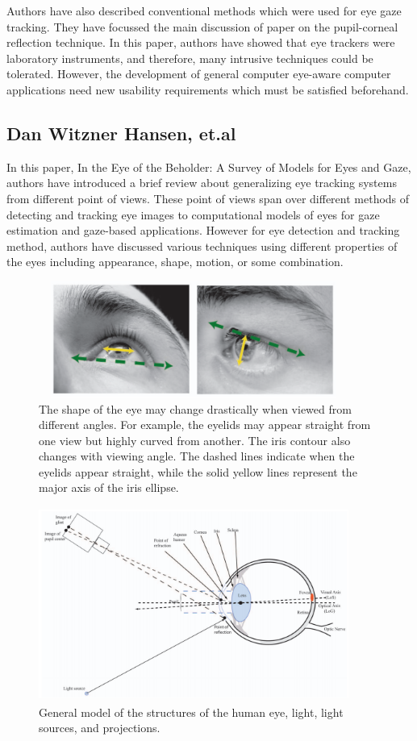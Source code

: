 Authors have also described conventional methods which were used for eye gaze tracking. They have focussed the main discussion of paper on the pupil-corneal reflection technique. In this paper, authors have showed that eye trackers were laboratory instruments, and therefore, many intrusive techniques could be tolerated. However, the development of general computer eye-aware computer applications need new usability requirements which must be satisfied beforehand.

\subsection{Dan Witzner Hansen, et.al \cite{16}}

In this paper, In the Eye of the Beholder: A Survey of Models for Eyes and Gaze, authors have introduced a brief review about generalizing eye tracking systems from different point of views. These point of views span over different methods of detecting and tracking eye images to computational models of eyes for gaze estimation and gaze-based applications. However for eye detection and tracking method, authors have discussed various techniques using different properties of the eyes including appearance, shape, motion, or some combination.

\begin{figure}[!hbt]
  \centering
  \includegraphics[width=4in,height=1.5in]{danWitzer.png}
  \caption{The shape of the eye may change drastically when viewed from different angles. For example, the eyelids may appear straight from one view but highly curved from another. The iris contour also changes with viewing angle. The dashed lines indicate when the eyelids appear straight, while the solid yellow lines represent the major axis of the iris ellipse.}
  \label{danwitzner}
\end{figure}

\begin{figure}[!hbt]
  \centering
  \includegraphics[width=4in,height=2.5in]{danWitzer2.png}
  \caption{General model of the structures of the human eye, light, light sources, and projections.}
  \label{danwitzner2}
\end{figure}


